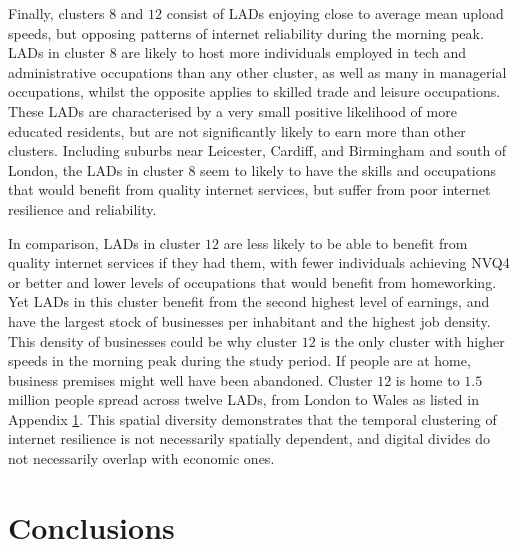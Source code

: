 \documentclass[Royal,times,sageh]{sagej}
\begin{document}
Finally, clusters \(8\) and \(12\) consist of LADs enjoying close to
average mean upload speeds, but opposing patterns of internet
reliability during the morning peak. LADs in cluster \(8\) are likely to
host more individuals employed in tech and administrative occupations
than any other cluster, as well as many in managerial occupations,
whilst the opposite applies to skilled trade and leisure occupations.
These LADs are characterised by a very small positive likelihood of more
educated residents, but are not significantly likely to earn more than
other clusters. Including suburbs near Leicester, Cardiff, and
Birmingham and south of London, the LADs in cluster \(8\) seem to likely
to have the skills and occupations that would benefit from quality
internet services, but suffer from poor internet resilience and
reliability.

In comparison, LADs in cluster \(12\) are less likely to be able to
benefit from quality internet services if they had them, with fewer
individuals achieving NVQ4 or better and lower levels of occupations
that would benefit from homeworking. Yet LADs in this cluster benefit
from the second highest level of earnings, and have the largest stock of
businesses per inhabitant and the highest job density. This density of
businesses could be why cluster \(12\) is the only cluster with higher
speeds in the morning peak during the study period. If people are at
home, business premises might well have been abandoned. Cluster \(12\)
is home to \(1.5\) million people spread across twelve LADs, from London
to Wales as listed in Appendix \protect\hyperlink{appendix1}{1}. This
spatial diversity demonstrates that the temporal clustering of internet
resilience is not necessarily spatially dependent, and digital divides
do not necessarily overlap with economic ones.

\hypertarget{sec:5}{%
\section{Conclusions}\label{sec:5}}
\end{document}
